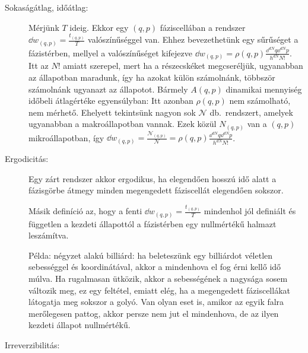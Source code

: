 \begin{description}
   \item[Sokaságátlag, időátlag:]
    
    Mérjünk $T$ ideig. Ekkor egy $(q,p)$ fáziscellában a rendszer $\dd w_{(q,p)}=\frac{t_{(q,p)}}{T}$ valószínűséggel van. Ehhez bevezethetünk egy sűrűséget a fázistérben, mellyel a valószínűséget kifejezve $\dd w_{(q,p)}=\rho(q,p)\frac{\dd^{dN}q\dd^{dN}p}{h^{dN}N!}$. Itt az $N!$ amiatt szerepel, mert ha a részecskéket megcseréljük, ugyanabban az állapotban maradunk, így ha azokat külön számolnánk, többször számolnánk ugyanazt az állapotot. Bármely $A(q,p)$ dinamikai mennyiség időbeli átlagértéke egyensúlyban:
    Itt azonban $\rho(q,p)$ nem számolható, nem mérhető. Ehelyett tekintsünk nagyon sok $\mathcal{N}$ db.\ rendszert, amelyek ugyanabban a makroállapotban vannak. Ezek közül $N_{(q,p)}$ van a $(q,p)$ mikroállapotban, így $\dd w_{(q,p)}=\frac{\mathcal{N}_{(q,p)}}{\mathcal{N}}=\rho(q,p)\frac{\dd^{dN}q\dd^{dN}p}{h^{dN}N!}$.
    
   \item[Ergodicitás:]
    
    Egy zárt rendszer akkor ergodikus, ha elegendően hosszú idő alatt a fázisgörbe átmegy minden megengedett fáziscellát elegendően sokszor.
    
    Másik definíció az, hogy a fenti $\dd w_{(q,p)}=\frac{t_{(q,p)}}{T}$ mindenhol jól definiált és független a kezdeti állapottól a fázistérben egy nullmértékű halmazt leszámítva. 
    
    Példa: négyzet alakú billiárd: ha beleteszünk egy billiárdot véletlen sebességgel és koordinátával, akkor a mindenhova el fog érni kellő idő múlva. Ha rugalmasan ütközik, akkor a sebességének a nagysága sosem változik meg, ez egy feltétel, emiatt elég, ha a megengedett fáziscellákat látogatja meg sokszor a golyó. Van olyan eset is, amikor az egyik falra merőlegesen pattog, akkor persze nem jut el mindenhova, de az ilyen kezdeti állapot nullmértékű.
    
   \item[Irreverzibilitás:]
    

\end{description}
